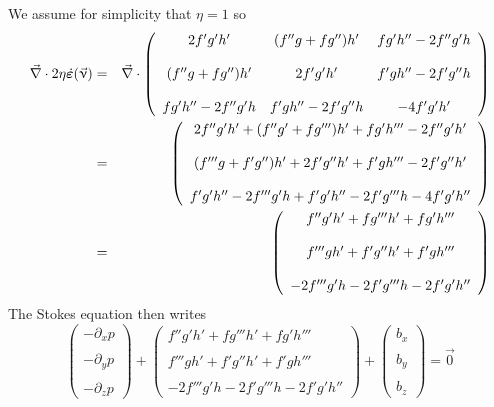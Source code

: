 We assume for simplicity that $\eta=1$ so 
\begin{eqnarray}
\vec\nabla\cdot 2\eta \dot{\bm \varepsilon}(\vec\upnu)
&=&
\vec\nabla\cdot \left(
\begin{array}{ccc}
2f'g'h'           & (f'' g+fg'') h'    & fg'h''-2f'' g' h \\ \\
(f''g+fg'')h'     & 2f'g'h'            & f'gh''-2f' g'' h \\ \\
fg'h'' -2f'' g' h & f'gh'' -2f' g'' h  & -4f'g'h'
\end{array}
\right) \nonumber\\
&=&
\left(
\begin{array}{c}
2f''g'h' +    (f''g'+fg''')h'   +   fg'h''' -2f'' g' h'   \\ \\
(f''' g+f'g'') h'  +     2f'g''h'   +     f'gh''' -2f' g'' h' \\ \\
f'g'h''-2f''' g' h   +  f'g'h''-2f' g''' h     -4f'g'h''
\end{array}
\right) \nonumber\\
&=&
\left(
\begin{array}{c}
f''g' h'  + fg''' h'  +  fg'h'''   \\ \\
f''' g h' + f'g'' h'  +  f'gh'''  \\ \\
-2f''' g' h     -2f' g''' h -2f'g'h''
\end{array}
\right) 
\end{eqnarray}
The Stokes equation then writes 
\[
\left(
\begin{array}{c}
-\partial_x p \\ \\
-\partial_y p \\ \\
-\partial_z p 
\end{array}
\right) 
+
\left(
\begin{array}{c}
f''g' h'  + fg''' h'  +  fg'h'''   \\ \\
f''' g h' + f'g'' h'  +  f'gh'''  \\ \\
-2f''' g' h     -2f' g''' h -2f'g'h''
\end{array}
\right) 
+
\left(
\begin{array}{c}
b_x \\ \\ b_y \\ \\ b_z
\end{array}
\right) 
=\vec{0}
\]
